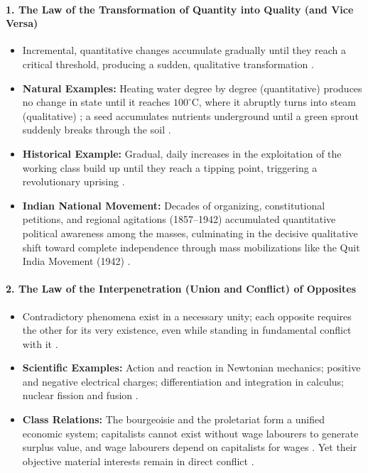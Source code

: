 \paragraph{1. The Law of the Transformation of Quantity into Quality (and Vice Versa)}
\begin{itemize}
    \item Incremental, quantitative changes accumulate gradually until they reach a critical threshold, producing a sudden, qualitative transformation .
    \item \textbf{Natural Examples:} Heating water degree by degree (quantitative) produces no change in state until it reaches $100^\circ\text{C}$, where it abruptly turns into steam (qualitative) ; a seed accumulates nutrients underground until a green sprout suddenly breaks through the soil .
    \item \textbf{Historical Example:} Gradual, daily increases in the exploitation of the working class build up until they reach a tipping point, triggering a revolutionary uprising .
    \item \textbf{Indian National Movement:} Decades of organizing, constitutional petitions, and regional agitations (1857--1942) accumulated quantitative political awareness among the masses, culminating in the decisive qualitative shift toward complete independence through mass mobilizations like the Quit India Movement (1942) .
\end{itemize}

\paragraph{2. The Law of the Interpenetration (Union and Conflict) of Opposites}
\begin{itemize}
    \item Contradictory phenomena exist in a necessary unity; each opposite requires the other for its very existence, even while standing in fundamental conflict with it .
    \item \textbf{Scientific Examples:} Action and reaction in Newtonian mechanics; positive and negative electrical charges; differentiation and integration in calculus; nuclear fission and fusion .
    \item \textbf{Class Relations:} The bourgeoisie and the proletariat form a unified economic system; capitalists cannot exist without wage labourers to generate surplus value, and wage labourers depend on capitalists for wages . Yet their objective material interests remain in direct conflict .
\end{itemize}

